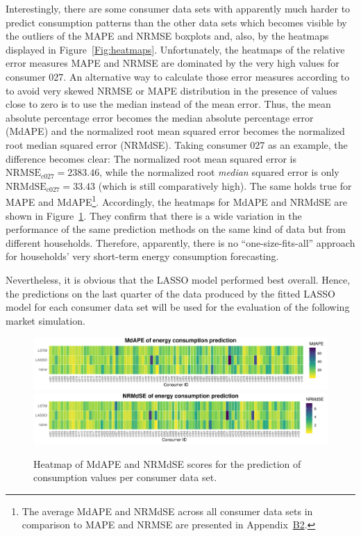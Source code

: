 Interestingly, there are some consumer data sets with apparently much harder to predict consumption patterns than the other data sets which becomes visible by the outliers of the MAPE and NRMSE boxplots and, also, by the heatmaps displayed in Figure~\ref{Fig:heatmaps}. Unfortunately, the heatmaps of the relative error measures MAPE and NRMSE are dominated by the very high values for consumer 027. An alternative way to calculate those error measures according to \citet{Hyndman:2006} to avoid very skewed NRMSE or MAPE distribution in the presence of values close to zero is to use the median instead of the mean error. Thus, the mean absolute percentage error becomes the median absolute percentage error (MdAPE) and the normalized root mean squared error becomes the normalized root median squared error (NRMdSE). Taking consumer 027 as an example, the difference becomes clear: The normalized root mean squared error is $\text{NRMSE}_{c027}=2383.46$, while the normalized root \emph{median} squared error is only $\text{NRMdSE}_{c027}=33.43$ (which is still comparatively high). The same holds true for MAPE and MdAPE\footnote{The average MdAPE and NRMdSE across all consumer data sets in comparison to MAPE and NRMSE are presented in Appendix~\hyperlink{AppB2:Tables:avg_errM_wMedian}{B2}.}. Accordingly, the heatmaps for MdAPE and NRMdSE are shown in Figure~\ref{Fig:heatmaps_median}. They confirm that there is a wide variation in the performance of the same prediction methods on the same kind of data but from different households. Therefore, apparently, there is no ``one-size-fits-all'' approach for households' very short-term energy consumption forecasting.

Nevertheless, it is obvious that the LASSO model performed best overall. Hence, the predictions on the last quarter of the data produced by the fitted LASSO model for each consumer data set will be used for the evaluation of the following market simulation.
%
\begin{figure}[htbp]
 \centering
 \includegraphics[width=\textwidth]{thesis/graphs/evaluation/c_heatmap_MdAPE.pdf}
 \includegraphics[width=\textwidth]{thesis/graphs/evaluation/c_heatmap_NRMdSE.pdf}
\caption[Heatmaps of MdAPE and NRMdSE for consumption values]{Heatmap of MdAPE and NRMdSE scores for the prediction of consumption values per consumer data set. \quantnet\href{ }{}}
\label{Fig:heatmaps_median}
\end{figure}
%



